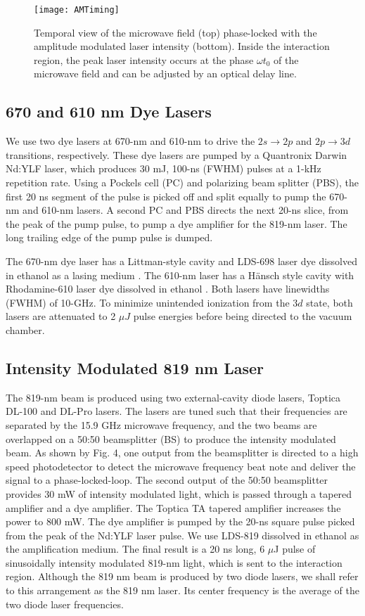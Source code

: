 \documentclass[aps,pra,preprint,groupedaddress]{revtex4-1}
\begin{document}
\begin{figure}
	\texttt{[image: AMTiming]}
	\caption{Temporal view of the microwave field (top) phase-locked with the amplitude modulated laser intensity (bottom). Inside the interaction region, the peak laser intensity occurs at the phase $\omega t_0$ of the microwave field and can be adjusted by an optical delay line.}
	\label{fig:AMLaser}
\end{figure}


\subsection{\label{sec:dye} 670 and 610 nm Dye Lasers}


We use two dye lasers at 670-nm and 610-nm to drive the $2s \rightarrow 2p$ and $2p \rightarrow 3d$ transitions, respectively. These dye lasers are pumped by a Quantronix Darwin Nd:YLF laser, which produces 30 mJ, 100-ns (FWHM) pulses at a 1-kHz repetition rate. Using a Pockels cell (PC) and polarizing beam splitter (PBS), the first 20 ns segment of the pulse is picked off and split equally to pump the 670-nm and 610-nm lasers. A second PC and PBS directs the next 20-ns slice, from the peak of the pump pulse, to pump a dye amplifier for the 819-nm laser. The long trailing edge of the pump pulse is dumped.


The 670-nm dye laser has a Littman-style cavity and LDS-698 laser dye dissolved in ethanol as a lasing medium \cite{Littman}. The 610-nm laser has a H{\"a}nsch style cavity with Rhodamine-610 laser dye dissolved in ethanol \cite{Hansch}. Both lasers have linewidths (FWHM) of 10-GHz. To minimize unintended ionization from the $3d$ state, both lasers are attenuated to 2 $\mu J$ pulse energies before being directed to the vacuum chamber.


\subsection{\label{sec:ampmod} Intensity Modulated 819 nm Laser}


The 819-nm beam is produced using two external-cavity diode lasers, Toptica DL-100 and DL-Pro lasers. The lasers are tuned such that their frequencies are separated by the 15.9 GHz microwave frequency, and the two beams are overlapped on a 50:50 beamsplitter (BS) to produce the intensity modulated beam. As shown by Fig. 4, one output from the beamsplitter is directed to a high speed photodetector to detect the microwave frequency beat note and deliver the signal to a phase-locked-loop. The second output of the 50:50 beamsplitter provides 30 mW of intensity modulated light, which is passed through a tapered amplifier and a dye amplifier. The Toptica TA tapered amplifier increases the power to 800 mW. The dye amplifier is pumped by the 20-ns square pulse picked from the peak of the Nd:YLF laser pulse. We use LDS-819 dissolved in ethanol as the amplification medium. The final result is a 20 ns long, 6 $\mu$J pulse of sinusoidally intensity modulated 819-nm light, which is sent to the interaction region. Although the 819 nm beam is produced by two diode lasers, we shall refer to this arrangement as the 819 nm laser. Its center frequency is the average of the two diode laser frequencies.
\end{document}
